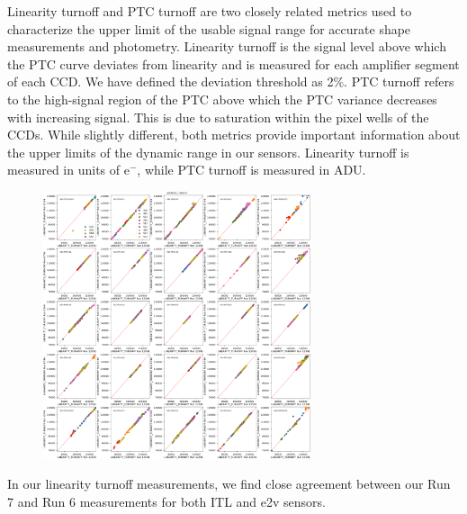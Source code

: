 Linearity turnoff and PTC turnoff are two closely related metrics used
to characterize the upper limit of the usable signal range for accurate shape measurements and photometry. Linearity turnoff is the signal level above which the PTC curve deviates from
linearity and is measured for each amplifier segment of each CCD. We have defined the deviation threshold as 2\%.
PTC turnoff refers to the high-signal region of the PTC above which the PTC
variance decreases with increasing signal. This is due to saturation within the pixel wells of the CCDs. While slightly different, both metrics
provide important information about the upper limits of the dynamic
range in our sensors. Linearity turnoff is measured in units of e$^-$,
while PTC turnoff is measured in ADU.

\begin{figure}[H]
\begin{centering}
\includegraphics[width=0.7\textwidth]{sections/figures/baselineCharacterization/13591_E749_LINEARITY_TURNOFF.png}
\end{centering}
\end{figure}

In our linearity turnoff measurements, we find close agreement between
our Run 7 and Run 6 measurements for both ITL and e2v sensors.

